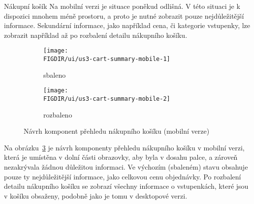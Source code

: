 \begin{subsection}{Nákupní košík}
    Na mobilní verzi je situace poněkud odlišná.
    V této situaci je k dispozici mnohem méně prostoru, a proto je nutné zobrazit pouze nejdůležitější informace.
    Sekundární informace, jako například cena, či kategorie vstupenky, lze zobrazit například až po rozbalení detailu nákupního košíku.

    \begin{figure}[H]
        \centering
        \begin{subfigure}{0.4\textwidth}
            \texttt{[image: \\FIGDIR/ui/us3-cart-summary-mobile-1]}
            \caption{sbaleno}
            \label{fig:us3-cart-summary-mobile-1}
        \end{subfigure}
        \hfill
        \begin{subfigure}{0.4\textwidth}
            \texttt{[image: \\FIGDIR/ui/us3-cart-summary-mobile-2]}
            \caption{rozbaleno}
            \label{fig:us3-cart-summary-mobile-2}
        \end{subfigure}

        \caption{Návrh komponent přehledu nákupního košíku (mobilní verze)}
        \label{fig:us3-cart-summary-mobile}
    \end{figure}

    Na obrázku~\ref{fig:us3-cart-summary-mobile} je návrh komponenty přehledu nákupního košíku v mobilní verzi, která je umístěna v dolní části obrazovky, aby byla v dosahu palce, a zároveň nezakrývala žádnou důležitou informaci.
    Ve výchozím (sbaleném) stavu obsahuje pouze ty nejdůležitější informace, jako celkovou cenu objednávky.
    Po rozbalení detailu nákupního košíku se zobrazí všechny informace o vstupenkách, které jsou v košíku obsaženy, podobně jako je tomu v desktopové verzi.
\end{subsection}

